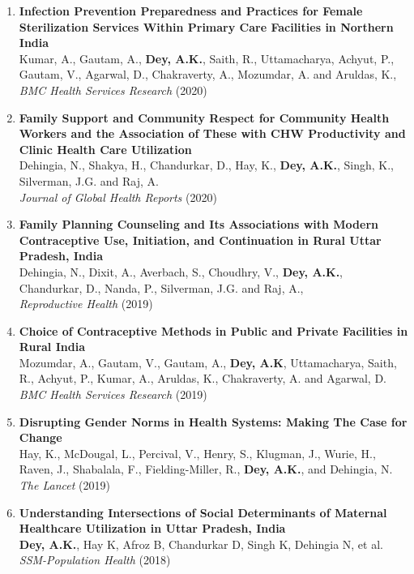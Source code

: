 \documentclass[11pt,letterpaper]{article}
\begin{document}
\begin{enumerate}
\item \textbf{Infection Prevention Preparedness and Practices for Female Sterilization Services Within Primary Care Facilities in Northern India}\\
Kumar, A., Gautam, A., \textbf{Dey, A.K.}, Saith, R., Uttamacharya, Achyut, P., Gautam, V., Agarwal, D., Chakraverty, A., Mozumdar, A. and Aruldas, K.,\\
\emph{BMC Health Services Research} (2020) 

\item \textbf{Family Support and Community Respect for Community Health Workers and the Association of These with CHW Productivity and Clinic Health Care Utilization}\\
Dehingia, N., Shakya, H., Chandurkar, D., Hay, K., \textbf{Dey, A.K.}, Singh, K., Silverman, J.G. and Raj, A.\\
\emph{Journal of Global Health Reports} (2020) 

\item \textbf{Family Planning Counseling and Its Associations with Modern Contraceptive Use, Initiation, and Continuation in Rural Uttar Pradesh, India}\\
Dehingia, N., Dixit, A., Averbach, S., Choudhry, V., \textbf{Dey, A.K.}, Chandurkar, D., Nanda, P., Silverman, J.G. and Raj, A.,\\
\emph{Reproductive Health} (2019) 

\item \textbf{Choice of Contraceptive Methods in Public and Private Facilities in Rural India}\\
Mozumdar, A., Gautam, V., Gautam, A., \textbf{Dey, A.K}, Uttamacharya, Saith, R., Achyut, P., Kumar, A., Aruldas, K., Chakraverty, A. and Agarwal, D.\\
\emph{BMC Health Services Research} (2019) 

\item \textbf{Disrupting Gender Norms in Health Systems: Making The Case for Change}\\
Hay, K., McDougal, L., Percival, V., Henry, S., Klugman, J., Wurie, H., Raven, J., Shabalala, F., Fielding-Miller, R., \textbf{Dey, A.K.}, and Dehingia, N.\\
\emph{The Lancet} (2019) 

\item \textbf{Understanding Intersections of Social Determinants of Maternal Healthcare Utilization in Uttar Pradesh, India}\\
\textbf{Dey, A.K.}, Hay K, Afroz B, Chandurkar D, Singh K, Dehingia N, et al.\\
\emph{SSM-Population Health} (2018) 


\end{enumerate}
\end{document}
